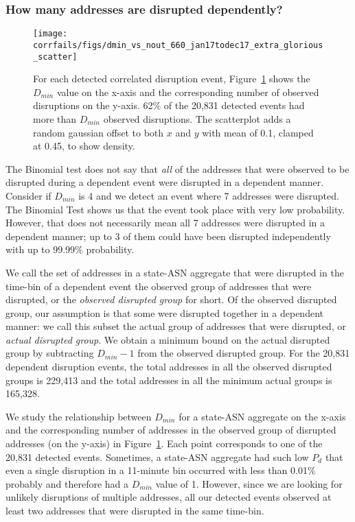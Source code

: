 
\subsubsection*{How many addresses are disrupted dependently?}

\begin{figure}[t]
    \centering
    \texttt{[image: corrfails/figs/dmin\_vs\_nout\_660\_jan17todec17\_extra\_glorious\_scatter]}
   \caption{
   \label{fig:dmin_vs_nout}
For each detected correlated disruption event,
Figure~\ref{fig:dmin_vs_nout} shows the $D_{min}$ value on the x-axis and
the corresponding number of observed disruptions on the y-axis. 62\% of
the 20,831 detected events had more than $D_{min}$ observed
disruptions.  The scatterplot adds a random gaussian offset to both $x$ and $y$ with mean of 0.1, clamped at 0.45, to show density.
 }
\end{figure}
%
\hfill
%

The Binomial test does not say that \emph{all} of the
addresses that were observed to be disrupted during a dependent
event were disrupted in a dependent manner. Consider if $D_{min}$ is 4 and we
detect an event where 7 addresses were disrupted. The Binomial Test
shows us that the event took place with very low probability. However,
that does not necessarily mean all 7 addresses were disrupted in a dependent manner;
up to 3 of them could have been disrupted independently with up to 99.99\%
probability.

We call the set of addresses in a state-ASN aggregate that were
disrupted in the time-bin of a dependent event the observed
group of addresses that were disrupted, or the \emph{observed
  disrupted group} for short. Of the observed disrupted group, our assumption is that some were disrupted together in a
dependent manner: we call this subset the actual group of
addresses that were disrupted, or \emph{actual disrupted group}. We obtain a minimum bound on the actual
disrupted group by subtracting $D_{min} - 1$
from the observed disrupted group. For the 20,831 dependent disruption
events, the total addresses in all the observed disrupted groups is 229,413 and
the total addresses in all the minimum actual groups is 165,328.

We study the relationship between $D_{min}$ for a state-ASN
aggregate on the x-axis and the
corresponding number of addresses in the observed group of disrupted addresses (on the
y-axis) in Figure~\ref{fig:dmin_vs_nout}. Each point corresponds to one
of the 20,831 detected events. Sometimes, a state-ASN
aggregate had such low $P_d$ that even a single disruption in a
11-minute bin occurred with less than 0.01\% probably and therefore
had a $D_{min}$ value of 1. However, since we are looking for unlikely
disruptions of multiple addresses, all our detected events observed at
least two addresses that were disrupted in the same time-bin.

